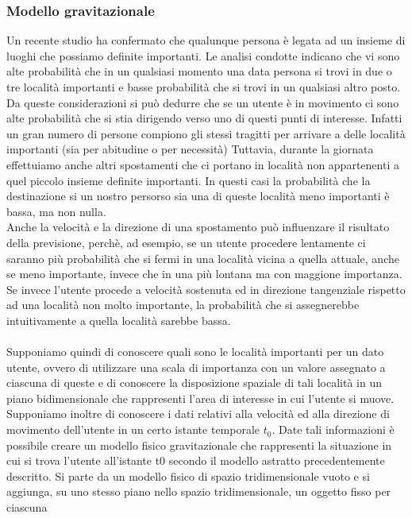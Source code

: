 \subsubsection{Modello gravitazionale}
Un recente studio \cite{cit_44} ha confermato che qualunque persona \`e legata ad un
insieme di luoghi che possiamo definite importanti. Le analisi condotte
indicano che vi sono alte probabilit\`a che in un qualsiasi momento una data
persona si trovi in due o tre localit\`a importanti e basse probabilit\`a che si trovi
in un qualsiasi altro posto. Da queste considerazioni si pu\`o dedurre che se un
utente \`e in movimento ci sono alte probabilit\`a che si stia dirigendo verso uno
di questi punti di interesse. Infatti un gran numero di persone compiono gli stessi
tragitti per arrivare a delle localit\`a importanti (sia per abitudine o per necessit\`a)
Tuttavia, durante la giornata effettuiamo anche altri spostamenti che ci portano in
localit\`a non appartenenti a quel piccolo insieme definite importanti. In questi casi
la probabilit\`a che la destinazione si un nostro persorso sia una di queste localit\`a
meno importanti \`e bassa, ma non nulla.\\
Anche la velocit\`a e la direzione di una spostamento pu\`o influenzare il risultato della
previsione, perch\`e, ad esempio, se un utente procedere lentamente ci saranno pi\`u
probabilit\`a che si fermi in una localit\`a vicina a quella attuale, anche se meno importante,
invece che in una pi\`u lontana ma con maggione importanza.
Se invece l'utente procede a velocit\`a sostenuta ed in direzione tangenziale rispetto
ad una localit\`a non molto importante, la probabilit\`a che si assegnerebbe
intuitivamente a quella localit\`a sarebbe bassa.\\
\\
Supponiamo quindi di conoscere quali sono le localit\`a importanti per un
dato utente, ovvero di utilizzare una scala di importanza con un valore assegnato
a ciascuna di queste e di conoscere la disposizione spaziale di tali localit\`a
in un piano bidimensionale che rappresenti l'area di interesse in cui l'utente
si muove. Supponiamo inoltre di conoscere i dati relativi alla velocit\`a ed alla
direzione di movimento dell'utente in un certo istante temporale $t_{0}$. Date tali
informazioni \`e possibile creare un modello fisico gravitazionale che rappresenti
la situazione in cui si trova l'utente all'istante t0 secondo il modello astratto
precedentemente descritto.
Si parte da un modello fisico di spazio tridimensionale vuoto e si aggiunga,
su uno stesso piano nello spazio tridimensionale, un oggetto fisso per ciascuna
